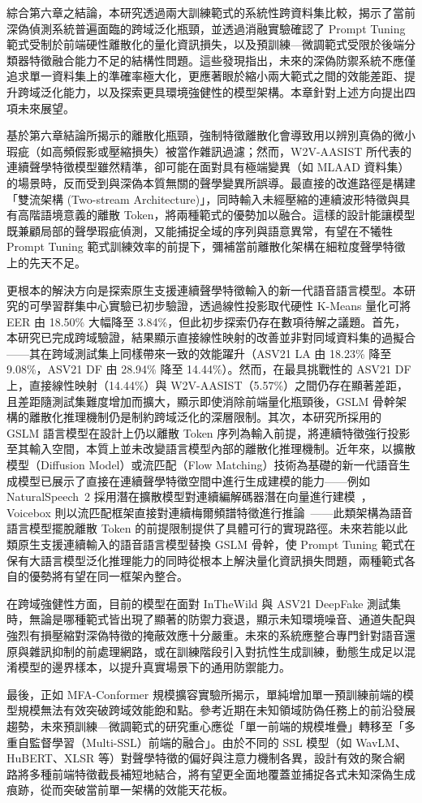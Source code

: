 綜合第六章之結論，本研究透過兩大訓練範式的系統性跨資料集比較，揭示了當前深偽偵測系統普遍面臨的跨域泛化瓶頸，並透過消融實驗確認了 Prompt Tuning 範式受制於前端硬性離散化的量化資訊損失，以及預訓練—微調範式受限於後端分類器特徵融合能力不足的結構性問題。這些發現指出，未來的深偽防禦系統不應僅追求單一資料集上的準確率極大化，更應著眼於縮小兩大範式之間的效能差距、提升跨域泛化能力，以及探索更具環境強健性的模型架構。本章針對上述方向提出四項未來展望。

基於第六章結論所揭示的離散化瓶頸，強制特徵離散化會導致用以辨別真偽的微小瑕疵（如高頻假影或壓縮損失）被當作雜訊過濾；然而，W2V-AASIST 所代表的連續聲學特徵模型雖然精準，卻可能在面對具有極端變異（如 MLAAD 資料集）的場景時，反而受到與深偽本質無關的聲學變異所誤導。最直接的改進路徑是構建「雙流架構 (Two-stream Architecture)」，同時輸入未經壓縮的連續波形特徵與具有高階語境意義的離散 Token，將兩種範式的優勢加以融合。這樣的設計能讓模型既兼顧局部的聲學瑕疵偵測，又能捕捉全域的序列與語意異常，有望在不犧牲 Prompt Tuning 範式訓練效率的前提下，彌補當前離散化架構在細粒度聲學特徵上的先天不足。

更根本的解決方向是探索原生支援連續聲學特徵輸入的新一代語音語言模型。本研究的可學習群集中心實驗已初步驗證，透過線性投影取代硬性 K-Means 量化可將 EER 由 18.50\% 大幅降至 3.84\%，但此初步探索仍存在數項待解之議題。首先，本研究已完成跨域驗證，結果顯示直接線性映射的改善並非對同域資料集的過擬合——其在跨域測試集上同樣帶來一致的效能躍升（ASV21 LA 由 18.23\% 降至 9.08\%，ASV21 DF 由 28.94\% 降至 14.44\%）。然而，在最具挑戰性的 ASV21 DF 上，直接線性映射（14.44\%）與 W2V-AASIST（5.57\%）之間仍存在顯著差距，且差距隨測試集難度增加而擴大，顯示即使消除前端量化瓶頸後，GSLM 骨幹架構的離散化推理機制仍是制約跨域泛化的深層限制。其次，本研究所採用的 GSLM 語言模型在設計上仍以離散 Token 序列為輸入前提，將連續特徵強行投影至其輸入空間，本質上並未改變語言模型內部的離散化推理機制。近年來，以擴散模型（Diffusion Model）或流匹配（Flow Matching）技術為基礎的新一代語音生成模型已展示了直接在連續聲學特徵空間中進行生成建模的能力——例如 NaturalSpeech~2 採用潛在擴散模型對連續編解碼器潛在向量進行建模~\cite{shen2024naturalspeech2}，Voicebox 則以流匹配框架直接對連續梅爾頻譜特徵進行推論~\cite{le2023voicebox}——此類架構為語音語言模型擺脫離散 Token 的前提限制提供了具體可行的實現路徑。未來若能以此類原生支援連續輸入的語音語言模型替換 GSLM 骨幹，使 Prompt Tuning 範式在保有大語言模型泛化推理能力的同時從根本上解決量化資訊損失問題，兩種範式各自的優勢將有望在同一框架內整合。

在跨域強健性方面，目前的模型在面對 InTheWild 與 ASV21 DeepFake 測試集時，無論是哪種範式皆出現了顯著的防禦力衰退，顯示未知環境噪音、通道失配與強烈有損壓縮對深偽特徵的掩蔽效應十分嚴重。未來的系統應整合專門針對語音還原與雜訊抑制的前處理網路，或在訓練階段引入對抗性生成訓練，動態生成足以混淆模型的邊界樣本，以提升真實場景下的通用防禦能力。

最後，正如 MFA-Conformer 規模擴容實驗所揭示，單純增加單一預訓練前端的模型規模無法有效突破跨域效能飽和點。參考近期在未知領域防偽任務上的前沿發展趨勢，未來預訓練—微調範式的研究重心應從「單一前端的規模堆疊」轉移至「多重自監督學習（Multi-SSL）前端的融合」。由於不同的 SSL 模型（如 WavLM、HuBERT、XLSR 等）對聲學特徵的偏好與注意力機制各異，設計有效的聚合網路將多種前端特徵截長補短地結合，將有望更全面地覆蓋並捕捉各式未知深偽生成痕跡，從而突破當前單一架構的效能天花板。

